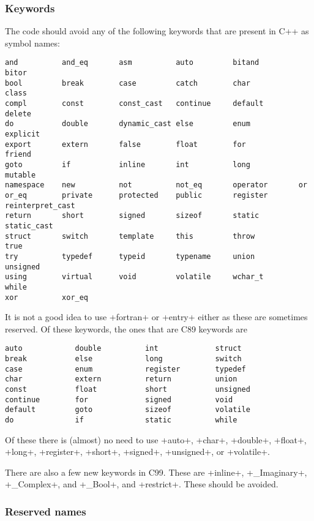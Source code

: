 \documentclass[10pt]{ligodcc}
\makeatletter
\def\verb{\relax\ifmmode\hbox\else\leavevmode\null\fi
  \bgroup
    \color{blue}\small
    \verb@eol@error \let\do\@makeother \dospecials
    \verbatim@font\@noligs
    \@ifstar\@sverb\@verb}
\makeatother
\begin{document}
\subsubsection*{Keywords}

The code should avoid any of the following
keywords that are present in C++ as symbol names:
\begin{verbatim}
and          and_eq       asm          auto         bitand         bitor
bool         break        case         catch        char           class
compl        const        const_cast   continue     default        delete
do           double       dynamic_cast else         enum           explicit
export       extern       false        float        for            friend
goto         if           inline       int          long           mutable
namespace    new          not          not_eq       operator       or
or_eq        private      protected    public       register       reinterpret_cast
return       short        signed       sizeof       static         static_cast
struct       switch       template     this         throw          true
try          typedef      typeid       typename     union          unsigned
using        virtual      void         volatile     wchar_t        while
xor          xor_eq
\end{verbatim}
It is not a good idea to use \verb+fortran+ or \verb+entry+ either as these
are sometimes reserved.  Of these keywords, the ones that are C89 keywords are
\begin{verbatim}
auto            double          int             struct
break           else            long            switch
case            enum            register        typedef
char            extern          return          union
const           float           short           unsigned
continue        for             signed          void
default         goto            sizeof          volatile
do              if              static          while
\end{verbatim}
Of these there is (almost) no need to use \verb+auto+, \verb+char+,
\verb+double+, \verb+float+, \verb+long+, \verb+register+, \verb+short+,
\verb+signed+, \verb+unsigned+, or \verb+volatile+.

There are also a few new keywords in C99.  These are
\verb+inline+, \verb+_Imaginary+, \verb+_Complex+, and \verb+_Bool+,
and \verb+restrict+.  These should be avoided.

\subsubsection*{Reserved names}
\end{document}
